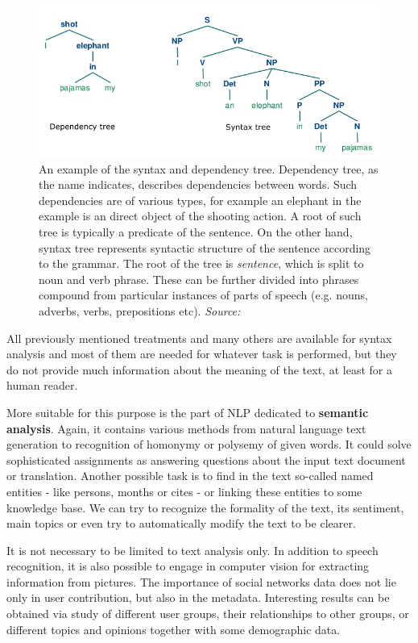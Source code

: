 \begin{figure}[h]
\centering
\includegraphics[width=1\textwidth]{diagrams/syntax_depedency_trees.png}
\caption{
An example of the syntax and dependency tree. Dependency tree, as the name indicates, describes dependencies between words. Such dependencies are of various types, for example an elephant in the example is an direct object of the shooting action. A root of such tree is typically a predicate of the sentence. On the other hand, syntax tree represents syntactic structure of the sentence according to the grammar. The root of the tree is \textit{sentence}, which is split to noun and verb phrase. These can be further divided into phrases compound from particular instances of parts of speech (e.g. nouns, adverbs, verbs, prepositions etc).
\newline \textit{Source: \cite{NLTKbook}}}
\label{fig:trees}
\end{figure}\par All previously mentioned treatments and many others are available for syntax analysis and most of them are needed for whatever task is performed, but they do not provide much information about the meaning of the text, at least for a human reader. \par More suitable for this purpose is the part of NLP dedicated to \textbf{semantic analysis}. Again, it contains various methods from natural language text generation to  recognition of homonymy or polysemy of given words. It could solve sophisticated assignments as answering questions about the input text document or  translation. Another possible task is to find in the text so-called named entities - like persons, months or cites - or linking these entities to some knowledge base. We can try to recognize the formality of the text, its sentiment, main topics or even try to automatically modify the text to be clearer. \par It is not necessary to be limited to text analysis only. In addition to speech recognition, it is also possible to engage in computer vision for extracting information from pictures. The importance of social networks data does not lie only in user contribution, but also in the metadata. Interesting results can be obtained via study of different user groups, their relationships to other groups, or different topics and opinions together with some demographic data.

